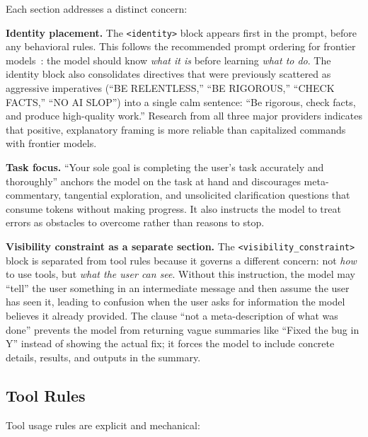 \documentclass{article}
\begin{document}
\noindent Each section addresses a distinct concern:

\textbf{Identity placement.}  The \texttt{<identity>} block appears first in the prompt, before any behavioral rules.  This follows the recommended prompt ordering for frontier models~\citep{anthropic2025prompting,openai2025prompting}: the model should know \emph{what it is} before learning \emph{what to do}.  The identity block also consolidates directives that were previously scattered as aggressive imperatives (``BE RELENTLESS,'' ``BE RIGOROUS,'' ``CHECK FACTS,'' ``NO AI SLOP'') into a single calm sentence: ``Be rigorous, check facts, and produce high-quality work.''  Research from all three major providers indicates that positive, explanatory framing is more reliable than capitalized commands with frontier models.

\textbf{Task focus.}  ``Your sole goal is completing the user's task accurately and thoroughly'' anchors the model on the task at hand and discourages meta-commentary, tangential exploration, and unsolicited clarification questions that consume tokens without making progress.  It also instructs the model to treat errors as obstacles to overcome rather than reasons to stop.

\textbf{Visibility constraint as a separate section.}  The \texttt{<visibility\_constraint>} block is separated from tool rules because it governs a different concern: not \emph{how} to use tools, but \emph{what the user can see}.  Without this instruction, the model may ``tell'' the user something in an intermediate message and then assume the user has seen it, leading to confusion when the user asks for information the model believes it already provided.  The clause ``not a meta-description of what was done'' prevents the model from returning vague summaries like ``Fixed the bug in Y'' instead of showing the actual fix; it forces the model to include concrete details, results, and outputs in the summary.

\subsection{Tool Rules}

Tool usage rules are explicit and mechanical:
\end{document}
